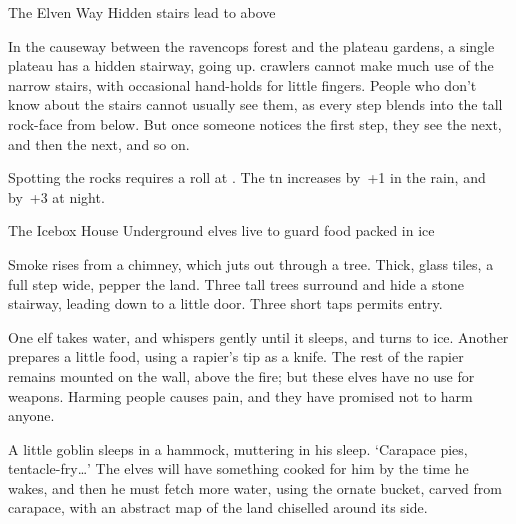 \begin{multicols}{2}
\romeo


{The Elven Way}%
{Hidden stairs lead to  above}%

In the causeway between the \gls{ravencops} forest and the plateau gardens, a single plateau has a hidden stairway, going up.
\Glspl{crawler} cannot make much use of the narrow stairs, with occasional hand-holds for little fingers.
People who don't know about the stairs cannot usually see them, as every step blends into the tall rock-face from below.
But once someone notices the first step, they see the next, and then the next, and so on.

Spotting the rocks requires a  roll at \tn[12].
The \gls{tn} increases by~+1 in the rain, and by~+3 at night.


{The Icebox House}%
{Underground elves live to guard food packed in ice}%


Smoke rises from a chimney, which juts out through a tree.
Thick, glass tiles, a full step wide, pepper the land.
Three tall trees surround and hide a stone stairway, leading down to a little door.
Three short taps permits entry.

One elf takes water, and whispers gently until it sleeps, and turns to ice.
Another prepares a little food, using a rapier's tip as a knife.
The rest of the rapier remains mounted on the wall, above the fire; but these elves have no use for weapons.
Harming people causes pain, and they have promised not to harm anyone.

A little goblin sleeps in a hammock, muttering in his sleep.
`Carapace pies, tentacle-fry\ldots'
The elves will have something cooked for him by the time he wakes, and then he must fetch more water, using the ornate bucket, carved from carapace, with an abstract map of the land chiselled around its side.


\end{multicols}
